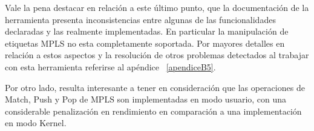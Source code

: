 Vale la pena destacar en relaci\'on a este \'ultimo punto, que la documentaci\'on de la herramienta presenta inconsistencias entre algunas de las funcionalidades declaradas y las realmente implementadas. En particular la manipulaci\'on de etiquetas MPLS no esta completamente soportada. Por mayores detalles en relaci\'on a estos aspectos y la resoluci\'on de otros problemas detectados al trabajar con esta herramienta referirse al ap\'endice ~\ref{apendiceB5}.
 


Por otro lado, resulta interesante a tener en consideraci\'on que las operaciones de Match, Push y Pop de MPLS son implementadas en modo usuario, con una considerable penalizaci\'on en rendimiento en comparaci\'on a una implementaci\'on en modo Kernel.


